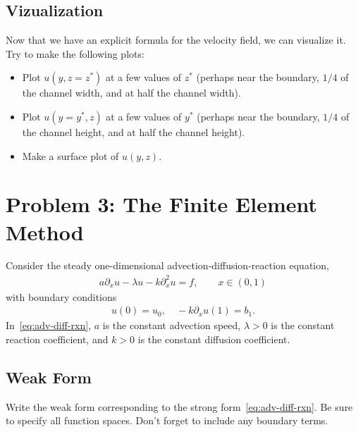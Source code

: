 \documentclass[11pt]{article}
\begin{document}


  \subsection{Vizualization}
  Now that we have an explicit formula for the velocity field, we can visualize it.  Try to make the following plots:
  \begin{itemize}
    \item Plot $u\left(y,z=z^{*}\right)$ at a few values of $z^{*}$ (perhaps near the boundary, $1/4$ of the channel width, and
at half the channel width).
    \item Plot $u\left(y=y^{*},z\right)$ at a few values of $y^{*}$ (perhaps near the boundary, $1/4$ of the channel height, and
at half the channel height).
    \item Make a surface plot of $u\left(y,z\right)$.
  \end{itemize}

 

\newpage
  \section{Problem 3: The Finite Element Method}

  Consider the steady one-dimensional advection-diffusion-reaction equation,
  \begin{align}
    a\partial_{x}u -\lambda u - k\partial_{x}^{2}u = f, \qquad x\in\left(0, 1\right)
    \label{eq:adv-diff-rxn}
  \end{align}
  with boundary conditions 
  \begin{align}
    u\left(0\right) = u_{0}, \quad -k\partial_{x}u\left(1\right) = b_{1}.
    \label{eq:adr_bcs}
  \end{align}
  In~\eqref{eq:adv-diff-rxn}, $a$ is the constant advection speed, $\lambda > 0$ is the constant reaction coefficient, and $k>0$ 
  is the constant diffusion coefficient.  

    \subsection{Weak Form}
    Write the weak form corresponding to the strong form~\eqref{eq:adv-diff-rxn}.  Be sure to specify all function spaces. Don't forget to include any boundary terms.\\

    
\end{document}
